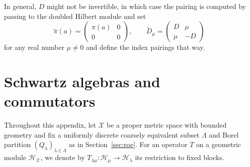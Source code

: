\documentclass[12pt]{amsart}
\newcommand{\Hh}{{\mathcal H}}
\newcommand{\Xx}{{\mathcal X}}
\begin{document}
In general, $D$ might not be invertible, in which case the pairing is computed by passing to the doubled Hilbert module and set \cite[Section~2.1]{Andersson2019}
$$\tilde{\pi}(a)=\begin{pmatrix}
    \pi(a) & 0 \\ 0 & 0
\end{pmatrix}, \qquad \tilde{D}_\mu = \begin{pmatrix}
    D & \mu \\ \mu & -D
\end{pmatrix}$$
for any real number $\mu\neq 0$ and define the index pairings that way. 


\section{Schwartz algebras and commutators}\label{sec:schwartz}
Throughout this appendix, let $\Xx$ be a proper metric space with bounded geometry and fix a uniformly discrete coarsely equivalent subset $\Lambda$ and Borel partition $(Q_\lambda)_{\lambda\in \Lambda}$ as in Section~\ref{sec:roe}. For an operator $T$ on a geometric module $\Hh_\Xx$, we denote by $T_{\lambda\mu}:\Hh_\mu\to \Hh_\lambda$ its restriction to fixed blocks.
\end{document}

